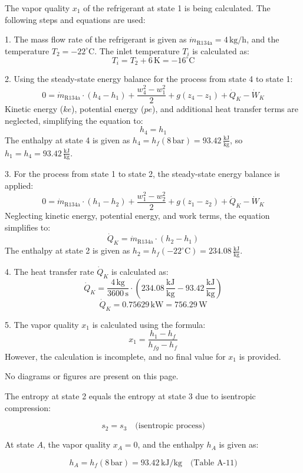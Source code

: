 The vapor quality \( x_1 \) of the refrigerant at state 1 is being calculated. The following steps and equations are used:

1. The mass flow rate of the refrigerant is given as \( \dot{m}_{\text{R134a}} = 4 \, \text{kg/h} \), and the temperature \( T_2 = -22^\circ\text{C} \).  
   The inlet temperature \( T_i \) is calculated as:  
   \[
   T_i = T_2 + 6 \, \text{K} = -16^\circ\text{C}
   \]

2. Using the steady-state energy balance for the process from state 4 to state 1:  
   \[
   0 = \dot{m}_{\text{R134a}} \cdot (h_4 - h_1) + \frac{w_4^2 - w_1^2}{2} + g(z_4 - z_1) + \dot{Q}_K - \dot{W}_K
   \]  
   Kinetic energy (\( ke \)), potential energy (\( pe \)), and additional heat transfer terms are neglected, simplifying the equation to:  
   \[
   h_4 = h_1
   \]  
   The enthalpy at state 4 is given as \( h_4 = h_f(8 \, \text{bar}) = 93.42 \, \frac{\text{kJ}}{\text{kg}} \), so \( h_1 = h_4 = 93.42 \, \frac{\text{kJ}}{\text{kg}} \).

3. For the process from state 1 to state 2, the steady-state energy balance is applied:  
   \[
   0 = \dot{m}_{\text{R134a}} \cdot (h_1 - h_2) + \frac{w_1^2 - w_2^2}{2} + g(z_1 - z_2) + \dot{Q}_K - \dot{W}_K
   \]  
   Neglecting kinetic energy, potential energy, and work terms, the equation simplifies to:  
   \[
   \dot{Q}_K = \dot{m}_{\text{R134a}} \cdot (h_2 - h_1)
   \]  
   The enthalpy at state 2 is given as \( h_2 = h_f(-22^\circ\text{C}) = 234.08 \, \frac{\text{kJ}}{\text{kg}} \).  

4. The heat transfer rate \( \dot{Q}_K \) is calculated as:  
   \[
   \dot{Q}_K = \frac{4 \, \text{kg}}{3600 \, \text{s}} \cdot \left( 234.08 \, \frac{\text{kJ}}{\text{kg}} - 93.42 \, \frac{\text{kJ}}{\text{kg}} \right)
   \]  
   \[
   \dot{Q}_K = 0.75629 \, \text{kW} = 756.29 \, \text{W}
   \]

5. The vapor quality \( x_1 \) is calculated using the formula:  
   \[
   x_1 = \frac{h_1 - h_f}{h_{fg} - h_f}
   \]  
   However, the calculation is incomplete, and no final value for \( x_1 \) is provided.

No diagrams or figures are present on this page.

The entropy at state 2 equals the entropy at state 3 due to isentropic compression:  

\[
s_2 = s_3 \quad \text{(isentropic process)}
\]

At state \( A \), the vapor quality \( x_A = 0 \), and the enthalpy \( h_A \) is given as:  

\[
h_A = h_f (8 \, \text{bar}) = 93.42 \, \text{kJ/kg} \quad \text{(Table A-11)}
\]
